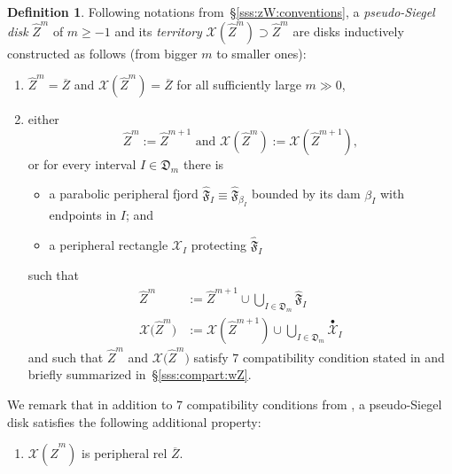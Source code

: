 \documentclass[11pt, reqno]{amsart}
\numberwithin{equation}{section}
\theoremstyle{plain}
\theoremstyle{theorem}
\theoremstyle{plain}
\theoremstyle{definition}
\newtheorem{defn}[theorem]{Definition}
\numberwithin{figure}{section}
\newcommand{\upbullet}[1]{\overset{\bullet}{ #1}{}}
\newcommand\XX{\mathcal{X}}
\newcommand{\wZ}{{\widehat Z}}
\begin{document}
\begin{defn}
\label{defn:pseudo-Siegel disks} Following notations from~\S\ref{sss:zW:conventions}, a \emph{pseudo-Siegel disk} 
$\widehat Z^m$ of $m\ge -1$ and its \emph{territory} $\XX (\wZ^m)\supset \wZ^m$ are disks inductively constructed as follows (from bigger $m$ to smaller ones):
\begin{enumerate}
\item $\widehat Z^m = \overline{Z}$ and $\XX(\widehat Z^m) = \overline{Z}$ for all sufficiently large $m \gg 0$,
\item either \[\widehat Z^m := \widehat Z^{m+1}\text{ and } \XX(\widehat Z^m) := \XX(\widehat Z^{m+1}),\] 
or for every interval $I\in \mathfrak D_m$ there is 
\begin{itemize}
    \item a parabolic peripheral fjord $\widehat{\mathfrak F}_I\equiv \widehat{\mathfrak F}_{\beta_I}$ bounded by its dam $\beta_I$ with endpoints in $I$; and
    \item a peripheral rectangle $\XX_I$ protecting $\widehat{\mathfrak F}_I$ 
\end{itemize}
 such that    
   \begin{equation}\label{eq:defn:pseudo-Siegel disks}
      \begin{aligned}
     \widehat Z^m &:= \widehat Z^{m+1} \cup \bigcup_{I\in \mathfrak{D}_m} \widehat{\mathfrak F}_{I}\\ 
         \XX \big(\widehat Z^m\big) &:= \XX(\wZ^{m+1})\cup \bigcup_{I\in \mathfrak{D}_m} \upbullet \XX_I 
    \end{aligned}\end{equation}
and such that $\wZ^m$ and $\XX \big(\widehat Z^m\big)$ satisfy $7$ compatibility condition stated in \cite[\S~5.1]{DL22} and briefly summarized in~\S\ref{sss:compart:wZ}. 
\end{enumerate}
\end{defn}

We remark that in addition to $7$ compatibility conditions from \cite[\S~5.1]{DL22}, a pseudo-Siegel disk satisfies the following additional property:
\vspace{0.1cm}

\begin{enumerate}[start=16, label=(\Alph*)]
\item \label{prop:P:wZ^m} $\XX(\wZ^m)$ is peripheral rel $\overline Z$. 
\end{enumerate}
\vspace{0.1cm}
\end{document}
